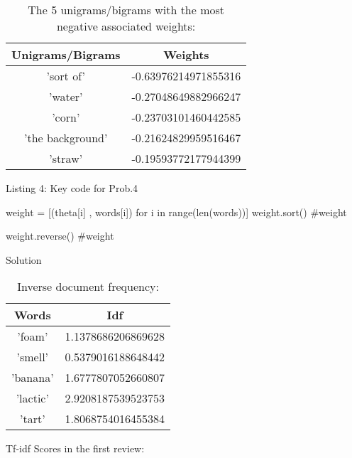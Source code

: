 \documentclass{assignment}
\begin{document}
\begin{problemlist}
\begin{table}[h]
\vspace{2ex}
\centering
\caption{The 5 unigrams/bigrams with the most negative associated weights:}
\vspace{1ex}

\begin{tabular}{|c|c|}
\hline
Unigrams/Bigrams & Weights \\
\hline
'sort of' & -0.63976214971855316\\
\hline
'water' & -0.27048649882966247 \\
\hline
'corn' & -0.23703101460442585 \\
\hline
'the background'& -0.21624829959516467 \\
\hline
'straw' & -0.19593772177944399 \\
\hline
\end{tabular}
\end{table}

\begin{center} 
Listing 4: Key code for Prob.4
\end{center}
\begin{python}
weight = [(theta[i] , words[i]) for i in range(len(words))]
weight.sort()
#weight

weight.reverse()
#weight
\end{python}

\pbitem Solution

\begin{table}[H]
\vspace{2ex}
\centering
\caption{Inverse document frequency:}
\vspace{1ex}

\begin{tabular}{|c|c|}
\hline
Words & Idf \\
\hline
'foam' & 1.1378686206869628\\
\hline
'smell' &  0.5379016188648442 \\
\hline
'banana' & 1.6777807052660807 \\
\hline
'lactic'& 2.9208187539523753 \\
\hline
'tart' & 1.8068754016455384 \\
\hline
\end{tabular}
\end{table}

\begin{table}[H]
\vspace{2ex}
\centering
\caption{Tf-idf Scores in the first review:}
\vspace{1ex}


\end{table}
\end{problemlist}
\end{document}
